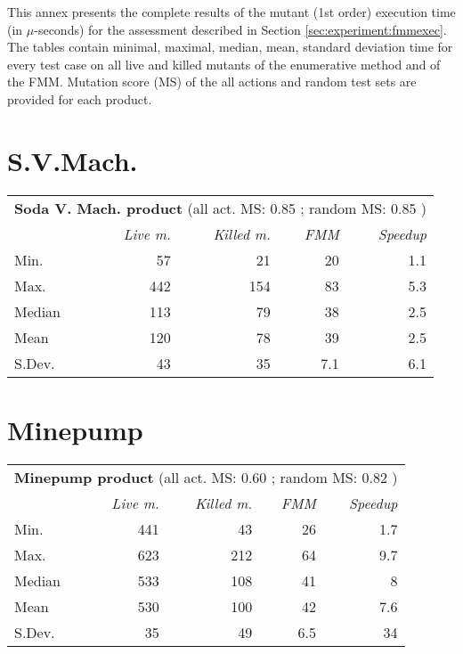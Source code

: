 
This annex presents the complete results of the mutant (1st order) execution time (in $\mu$-seconds) for the assessment described in Section \ref{sec:experiment:fmmexec}. The tables contain minimal, maximal, median, mean, standard deviation time for every test case on all live and killed mutants of the enumerative method and of the FMM. Mutation score (MS) of the all actions and random test sets are provided for each product.

\section{S.V.Mach.}

\begin{tabularx}{90mm}{X rrrr}
\hline \multicolumn{5}{c}{ \textbf{Soda V. Mach. product} (all act. MS: 0.85 ; random MS: 0.85 )}	\\
	& \textit{Live m.}	& \textit{Killed m.} & \textit{FMM}& \textit{Speedup}\\
\hline Min. &  57   &  21   &  20    & 1.1 \\
Max. &  442   &  154   &  83    & 5.3 \\
Median			&  113   &  79   &  38    & 2.5 \\
Mean			&  120   &  78   &  39  & 2.5 \\
S.Dev.	&  43   &  35  &  7.1   &  6.1 \\
\hline
\end{tabularx}
%
%


\section{Minepump}

\begin{tabularx}{90mm}{X rrrr}
\hline	\multicolumn{5}{c}{ \textbf{Minepump  product} (all act. MS: 0.60 ; random MS: 0.82 )}	\\
	& \textit{Live m.}	& \textit{Killed m.} & \textit{FMM}& \textit{Speedup}\\
\hline Min. &  441   &  43   &  26    & 1.7 \\
Max. &  623   &  212   &  64    & 9.7 \\
Median			&  533   &  108   &  41    & 8 \\
Mean			&  530   &  100   &  42  & 7.6 \\
S.Dev.	&  35   &  49  &  6.5   &  34 \\
\hline
\end{tabularx}
%
%



